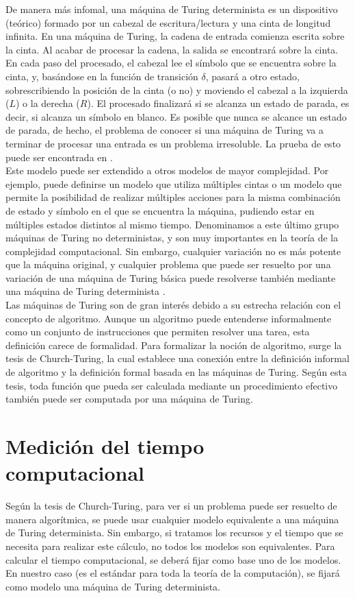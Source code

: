 De manera más infomal, una máquina de Turing determinista es un dispositivo (teórico) formado por un cabezal de escritura/lectura y una cinta de longitud infinita. En una máquina de Turing, la cadena de entrada comienza escrita sobre la cinta. Al acabar de procesar la cadena, la salida se encontrará sobre la cinta. En cada paso del procesado, el cabezal lee el símbolo que se encuentra sobre la cinta, y, basándose en la función de transición $\delta$, pasará a otro estado, sobrescribiendo la posición de la cinta (o no) y moviendo el cabezal a la izquierda ($L$) o la derecha ($R$). El procesado finalizará si se alcanza un estado de parada, es decir, si alcanza un símbolo en blanco. Es posible que nunca se alcance un estado de parada, de hecho, el problema de conocer si una máquina de Turing va a terminar de procesar una entrada es un problema irresoluble. La prueba de esto puede ser encontrada en \cite{sipser-cc}.\\

Este modelo puede ser extendido a otros modelos de mayor complejidad. Por ejemplo, puede definirse un modelo que utiliza múltiples cintas o un modelo que permite la posibilidad de realizar múltiples acciones para la misma combinación de estado y símbolo en el que se encuentra la máquina, pudiendo estar en múltiples estados distintos al mismo tiempo. Denominamos a este último grupo máquinas de Turing no deterministas, y son muy importantes en la teoría de la complejidad computacional. Sin embargo, cualquier variación no es más potente que la máquina original, y cualquier problema que puede ser resuelto por una variación de una máquina de Turing básica puede resolverse también mediante una máquina de Turing determinista \cite{sipser-cc}.\\

Las máquinas de Turing son de gran interés debido a su estrecha relación con el concepto de algoritmo. Aunque un algoritmo puede entenderse informalmente como un conjunto de instrucciones que permiten resolver una tarea, esta definición carece de formalidad. Para formalizar la noción de algoritmo, surge la tesis de Church-Turing, la cual establece una conexión entre la definición informal de algoritmo y la definición formal basada en las máquinas de Turing. Según esta tesis, toda función que pueda ser calculada mediante un procedimiento efectivo también puede ser computada por una máquina de Turing.

\section{Medición del tiempo computacional}
Según la tesis de Church-Turing, para ver si un problema puede ser resuelto de manera algorítmica, se puede usar cualquier modelo equivalente a una máquina de Turing determinista. Sin embargo, si tratamos los recursos y el tiempo que se necesita para realizar este cálculo, no todos los modelos son equivalentes. Para calcular el tiempo computacional, se deberá fijar como base uno de los modelos. En nuestro caso (es el estándar para toda la teoría de la computación), se fijará como modelo una máquina de Turing determinista.\\

